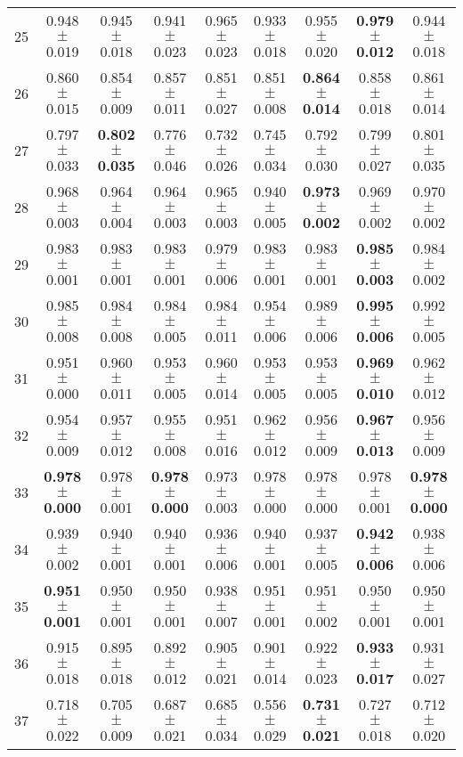 \begin{table}[!ht]
{\begin{tabular}{r c c c c c c c c}
25 & 0.948 $\pm$ 0.019 & 0.945 $\pm$ 0.018 & 0.941 $\pm$ 0.023 & 0.965 $\pm$ 0.023 & 0.933 $\pm$ 0.018 & 0.955 $\pm$ 0.020 & \textbf{0.979 $\pm$ 0.012} & 0.944 $\pm$ 0.018 \\
26 & 0.860 $\pm$ 0.015 & 0.854 $\pm$ 0.009 & 0.857 $\pm$ 0.011 & 0.851 $\pm$ 0.027 & 0.851 $\pm$ 0.008 & \textbf{0.864 $\pm$ 0.014} & 0.858 $\pm$ 0.018 & 0.861 $\pm$ 0.014 \\
27 & 0.797 $\pm$ 0.033 & \textbf{0.802 $\pm$ 0.035} & 0.776 $\pm$ 0.046 & 0.732 $\pm$ 0.026 & 0.745 $\pm$ 0.034 & 0.792 $\pm$ 0.030 & 0.799 $\pm$ 0.027 & 0.801 $\pm$ 0.035 \\
28 & 0.968 $\pm$ 0.003 & 0.964 $\pm$ 0.004 & 0.964 $\pm$ 0.003 & 0.965 $\pm$ 0.003 & 0.940 $\pm$ 0.005 & \textbf{0.973 $\pm$ 0.002} & 0.969 $\pm$ 0.002 & 0.970 $\pm$ 0.002 \\
29 & 0.983 $\pm$ 0.001 & 0.983 $\pm$ 0.001 & 0.983 $\pm$ 0.001 & 0.979 $\pm$ 0.006 & 0.983 $\pm$ 0.001 & 0.983 $\pm$ 0.001 & \textbf{0.985 $\pm$ 0.003} & 0.984 $\pm$ 0.002 \\
30 & 0.985 $\pm$ 0.008 & 0.984 $\pm$ 0.008 & 0.984 $\pm$ 0.005 & 0.984 $\pm$ 0.011 & 0.954 $\pm$ 0.006 & 0.989 $\pm$ 0.006 & \textbf{0.995 $\pm$ 0.006} & 0.992 $\pm$ 0.005 \\
31 & 0.951 $\pm$ 0.000 & 0.960 $\pm$ 0.011 & 0.953 $\pm$ 0.005 & 0.960 $\pm$ 0.014 & 0.953 $\pm$ 0.005 & 0.953 $\pm$ 0.005 & \textbf{0.969 $\pm$ 0.010} & 0.962 $\pm$ 0.012 \\
32 & 0.954 $\pm$ 0.009 & 0.957 $\pm$ 0.012 & 0.955 $\pm$ 0.008 & 0.951 $\pm$ 0.016 & 0.962 $\pm$ 0.012 & 0.956 $\pm$ 0.009 & \textbf{0.967 $\pm$ 0.013} & 0.956 $\pm$ 0.009 \\
33 & \textbf{0.978 $\pm$ 0.000} & 0.978 $\pm$ 0.001 & \textbf{0.978 $\pm$ 0.000} & 0.973 $\pm$ 0.003 & 0.978 $\pm$ 0.000 & 0.978 $\pm$ 0.000 & 0.978 $\pm$ 0.001 & \textbf{0.978 $\pm$ 0.000} \\
34 & 0.939 $\pm$ 0.002 & 0.940 $\pm$ 0.001 & 0.940 $\pm$ 0.001 & 0.936 $\pm$ 0.006 & 0.940 $\pm$ 0.001 & 0.937 $\pm$ 0.005 & \textbf{0.942 $\pm$ 0.006} & 0.938 $\pm$ 0.006 \\
35 & \textbf{0.951 $\pm$ 0.001} & 0.950 $\pm$ 0.001 & 0.950 $\pm$ 0.001 & 0.938 $\pm$ 0.007 & 0.951 $\pm$ 0.001 & 0.951 $\pm$ 0.002 & 0.950 $\pm$ 0.001 & 0.950 $\pm$ 0.001 \\
36 & 0.915 $\pm$ 0.018 & 0.895 $\pm$ 0.018 & 0.892 $\pm$ 0.012 & 0.905 $\pm$ 0.021 & 0.901 $\pm$ 0.014 & 0.922 $\pm$ 0.023 & \textbf{0.933 $\pm$ 0.017} & 0.931 $\pm$ 0.027 \\
37 & 0.718 $\pm$ 0.022 & 0.705 $\pm$ 0.009 & 0.687 $\pm$ 0.021 & 0.685 $\pm$ 0.034 & 0.556 $\pm$ 0.029 & \textbf{0.731 $\pm$ 0.021} & 0.727 $\pm$ 0.018 & 0.712 $\pm$ 0.020 \\

\end{tabular}}
\end{table}
